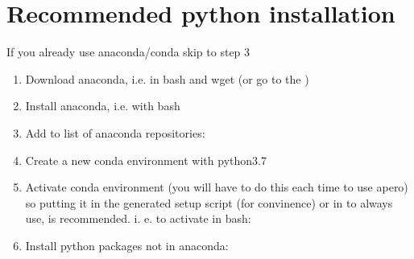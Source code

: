 \documentclass[a4paper,10pt,english]{report}
\begin{document}
\section{Recommended python installation}
\label{\detokenize{misc/pythoninstallation:recommended-python-installation}}\label{\detokenize{misc/pythoninstallation:python-installation}}\label{\detokenize{misc/pythoninstallation::doc}}
If you already use anaconda/conda skip to step 3
\begin{enumerate}
%
\item {} 
Download anaconda, i.e. in bash and wget (or go to the
)
\begin{quote}

\end{quote}

\item {} 
Install anaconda, i.e. with bash
\begin{quote}

\end{quote}

\item {} \begin{description}
\item[{Add  to list of anaconda repositories:}] \leavevmode
{}

\end{description}

\item {} \begin{description}
\item[{Create a new conda environment with python3.7}] \leavevmode
{}

\end{description}

\item {} 
Activate conda environment (you will have to do this each time to use apero)
so putting it in the generated setup script (for convinence) or in
  to always use, is recommended.
i. e. to activate in bash:

\item {} \begin{description}
\item[{Install python packages not in anaconda:}] \leavevmode
{}

\end{description}

\end{enumerate}
\end{document}
